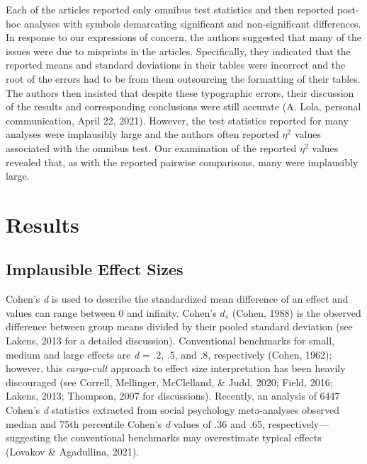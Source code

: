 \documentclass[
  english,
  man,floatsintext]{apa7}
\begin{document}
Each of the articles reported only omnibus test statistics and then reported post-hoc analyses with symbols demarcating significant and non-significant differences. In response to our expressions of concern, the authors suggested that many of the issues were due to misprints in the articles. Specifically, they indicated that the reported means and standard deviations in their tables were incorrect and the root of the errors had to be from them outsourcing the formatting of their tables. The authors then insisted that despite these typographic errors, their discussion of the results and corresponding conclusions were still accurate (A. Lola, personal communication, April 22, 2021). However, the test statistics reported for many analyses were implausibly large and the authors often reported \(\eta^{2}\) values associated with the omnibus test. Our examination of the reported \(\eta^{2}\) values revealed that, as with the reported pairwise comparisons, many were implausibly large.

\hypertarget{results}{%
\section{Results}\label{results}}

\hypertarget{implausible-effect-sizes}{%
\subsection{Implausible Effect Sizes}\label{implausible-effect-sizes}}

Cohen's \emph{d} is used to describe the standardized mean difference of an effect and values can range between 0 and infinity. Cohen's \(d_{s}\) (Cohen, 1988) is the observed difference between group means divided by their pooled standard deviation (see Lakens, 2013 for a detailed discussion). Conventional benchmarks for small, medium and large effects are \emph{d} = .2, .5, and .8, respectively (Cohen, 1962); however, this \emph{cargo-cult} approach to effect size interpretation has been heavily discouraged (see Correll, Mellinger, McClelland, \& Judd, 2020; Field, 2016; Lakens, 2013; Thompson, 2007 for discussions). Recently, an analysis of 6447 Cohen's \emph{d} statistics extracted from social psychology meta-analyses observed median and 75th percentile Cohen's \emph{d} values of .36 and .65, respectively---suggesting the conventional benchmarks may overestimate typical effects (Lovakov \& Agadullina, 2021).
\end{document}
